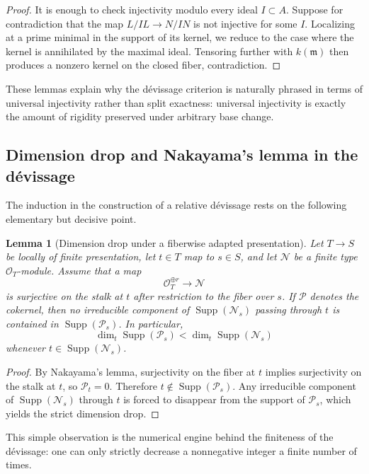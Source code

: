 \documentclass[11pt,oneside]{article}
\newtheorem{lemma}[theorem]{Lemma}
\newcommand{\N}{\mathcal N}
\newcommand{\Pcal}{\mathcal P}
\newcommand{\OO}{\mathcal O}
\newcommand{\Supp}{\operatorname{Supp}}
\begin{document}
\begin{proof}
It is enough to check injectivity modulo every ideal $I\subset A$.  Suppose for contradiction that the map $L/IL\to N/IN$ is not injective for some $I$.  Localizing at a prime minimal in the support of its kernel, we reduce to the case where the kernel is annihilated by the maximal ideal.  Tensoring further with $k(\mathfrak m)$ then produces a nonzero kernel on the closed fiber, contradiction.
\end{proof}

These lemmas explain why the d\'evissage criterion is naturally phrased in terms of universal injectivity rather than split exactness: universal injectivity is exactly the amount of rigidity preserved under arbitrary base change.

\subsection{Dimension drop and Nakayama's lemma in the d\'evissage}

The induction in the construction of a relative d\'evissage rests on the following elementary but decisive point.

\begin{lemma}[Dimension drop under a fiberwise adapted presentation]\label{lem:dimension-drop-expanded}
Let $T\to S$ be locally of finite presentation, let $t\in T$ map to $s\in S$, and let $\N$ be a finite type $\OO_T$-module.  Assume that a map
\[
\OO_T^{\oplus r}\longrightarrow \N
\]
is surjective on the stalk at $t$ after restriction to the fiber over $s$.  If $\Pcal$ denotes the cokernel, then no irreducible component of $\Supp(\N_s)$ passing through $t$ is contained in $\Supp(\Pcal_s)$.  In particular,
\[
\dim_t\Supp(\Pcal_s)<\dim_t\Supp(\N_s)
\]
whenever $t\in\Supp(\N_s)$.
\end{lemma}

\begin{proof}
By Nakayama's lemma, surjectivity on the fiber at $t$ implies surjectivity on the stalk at $t$, so $\Pcal_t=0$.  Therefore $t\notin\Supp(\Pcal_s)$.  Any irreducible component of $\Supp(\N_s)$ through $t$ is forced to disappear from the support of $\Pcal_s$, which yields the strict dimension drop.
\end{proof}

This simple observation is the numerical engine behind the finiteness of the d\'evissage: one can only strictly decrease a nonnegative integer a finite number of times.
\end{document}
